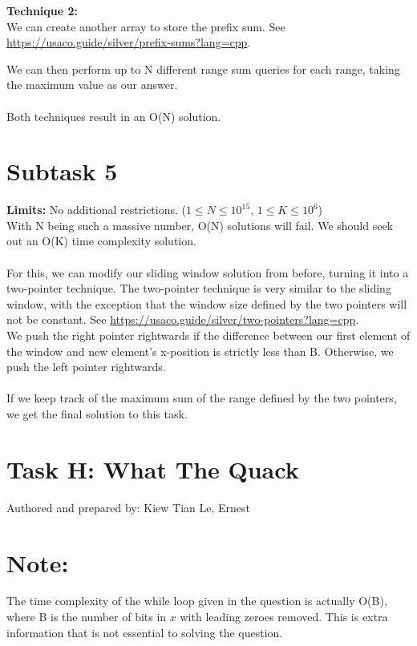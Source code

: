 \documentclass{report}
\begin{document}
\textbf{Technique 2:}\\
We can create another array to store the prefix sum. See \href{https://usaco.guide/silver/prefix-sums?lang=cpp}{https://usaco.guide/silver/prefix-sums?lang=cpp}.

We can then perform up to N different range sum queries for each range, taking the maximum value as our answer.\\\\

Both techniques result in an O(N) solution.

\section*{Subtask 5}
\textbf{Limits: } No additional restrictions. ($1 \leq N \leq 10^{15}$, $1 \leq K \leq 10^{6}$)\\
With N being such a massive number, O(N) solutions will fail. We should seek out an O(K) time complexity solution.\\\\
For this, we can modify our sliding window solution from before, turning it into a two-pointer technique. The two-pointer technique is very similar to the sliding window, with the exception that the window size defined by the two pointers will not be constant. See \href{https://usaco.guide/silver/two-pointers?lang=cpp}{https://usaco.guide/silver/two-pointers?lang=cpp}.\\

We push the right pointer rightwards if the difference between our first element of the window and new element's x-position is strictly less than B. Otherwise, we push the left pointer rightwards.\\\\

If we keep track of the maximum sum of the range defined by the two pointers, we get the final solution to this task.
\pagebreak

\section*{Task H: What The Quack}
Authored and prepared by: Kiew Tian Le, Ernest

\section*{Note:}
The time complexity of the while loop given in the question is actually O(B), where B is the number of bits in $x$ with leading zeroes removed. This is extra information that is not essential to solving the question.
\end{document}
